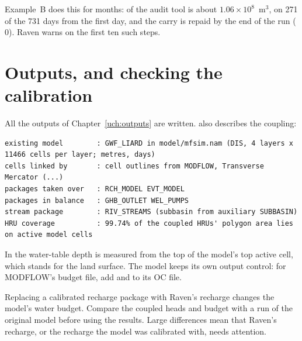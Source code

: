 Example~B does this for months:  of the audit tool is about $1.06\times10^{8}$~m$^3$, on 271
of the 731 days from the first day, and the carry is repaid by the end of the run ( 0).
Raven warns on the first ten such steps.

\section{Outputs, and checking the calibration}
All the outputs of Chapter~\ref{uch:outputs} are written.  also describes the coupling:
\begin{lstlisting}
existing model        : GWF_LIARD in model/mfsim.nam (DIS, 4 layers x 11466 cells per layer; metres, days)
cells linked by       : cell outlines from MODFLOW, Transverse Mercator (...)
packages taken over   : RCH_MODEL EVT_MODEL
packages in balance   : GHB_OUTLET WEL_PUMPS
stream package        : RIV_STREAMS (subbasin from auxiliary SUBBASIN)
HRU coverage          : 99.74% of the coupled HRUs' polygon area lies on active model cells
\end{lstlisting}
In  the water-table depth is measured from the top of the model's top active cell, which stands for
the land surface. The model keeps its own output control: for MODFLOW's budget file, add  and
 to its OC file.

Replacing a calibrated recharge package with Raven's recharge changes the model's water budget. Compare the coupled heads
and budget with a run of the original model before using the results. Large differences mean that Raven's recharge, or
the recharge the model was calibrated with, needs attention.
